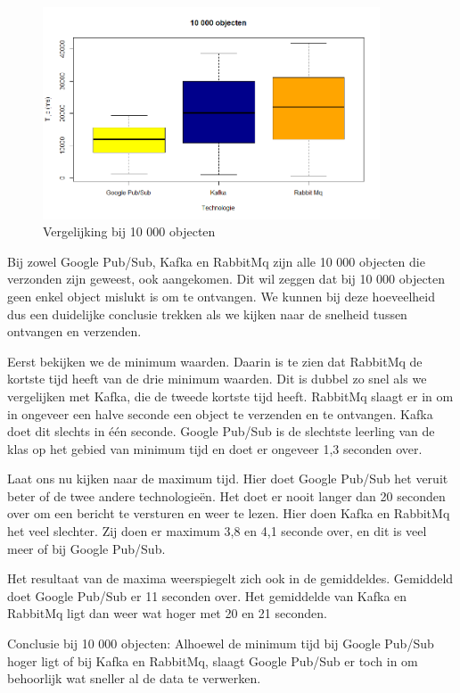  \begin{figure}[h!]
    \centering
    \includegraphics[width=100mm]{../10000Boxplot.png}
    \caption{Vergelijking bij 10 000 objecten}
    
\end{figure}

Bij zowel Google Pub/Sub, Kafka en RabbitMq zijn alle 10 000 objecten die verzonden zijn geweest, ook aangekomen. Dit wil zeggen dat bij 10 000 objecten geen enkel object mislukt is om te ontvangen. We kunnen bij deze hoeveelheid dus een duidelijke conclusie trekken als we kijken naar de snelheid tussen ontvangen en verzenden. 

Eerst bekijken we de minimum waarden. Daarin is te zien dat RabbitMq de kortste tijd heeft van de drie minimum waarden. Dit is dubbel zo snel als we vergelijken met Kafka, die de tweede kortste tijd heeft. RabbitMq slaagt er in om in ongeveer een halve seconde een object te verzenden en te ontvangen. Kafka doet dit slechts in één seconde. Google Pub/Sub is de slechtste leerling van de klas op het gebied van minimum tijd en doet er ongeveer 1,3 seconden over.

Laat ons nu kijken naar de maximum tijd. Hier doet Google Pub/Sub het veruit beter of de twee andere technologieën. Het doet er nooit langer dan 20 seconden over om een bericht te versturen en weer te lezen. Hier doen Kafka en RabbitMq het veel slechter. Zij doen er maximum 3,8 en 4,1 seconde over, en dit is veel meer of bij Google Pub/Sub.

Het resultaat van de maxima weerspiegelt zich ook in de gemiddeldes. Gemiddeld doet Google Pub/Sub er 11 seconden over. Het gemiddelde van Kafka en RabbitMq ligt dan weer wat hoger met 20 en 21 seconden.

Conclusie bij 10 000 objecten: Alhoewel de minimum tijd bij Google Pub/Sub hoger ligt of bij Kafka en RabbitMq, slaagt Google Pub/Sub er toch in om behoorlijk wat sneller al de data te verwerken. 


